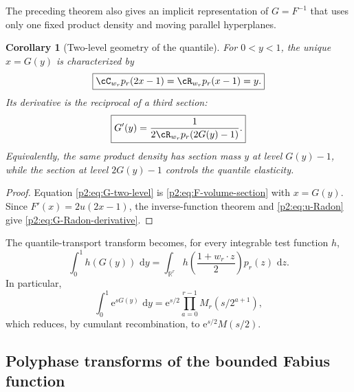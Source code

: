 \documentclass[11pt,oneside]{article}
\newtheorem{corollary}[theorem]{Corollary}
\theoremstyle{definition}
\newcommand{\dd}{\,\mathrm d}
\newcommand{\e}{\mathrm e}
\newcommand{\R}{\mathbb R}
\begin{document}
The preceding theorem also gives an implicit representation of $G=F^{-1}$ that
uses only one fixed product density and moving parallel hyperplanes.

\begin{corollary}[Two-level geometry of the quantile]
\label{p2:cor:inverse-geometry}
For $0<y<1$, the unique $x=G(y)$ is characterized by
\begin{equation}
 \boxed{\displaystyle
 \cC_{w_r}p_r(2x-1)=\cR_{w_r}p_r(x-1)=y.}                 \label{p2:eq:G-two-level}
\end{equation}
Its derivative is the reciprocal of a third section:
\begin{equation}
 \boxed{\displaystyle
 G'(y)=\frac1{2\cR_{w_r}p_r(2G(y)-1)}.}                   \label{p2:eq:G-Radon-derivative}
\end{equation}
Equivalently, the same product density has section mass $y$ at level $G(y)-1$,
while the section at level $2G(y)-1$ controls the quantile elasticity.
\end{corollary}

\begin{proof}
Equation \eqref{p2:eq:G-two-level} is \eqref{p2:eq:F-volume-section} with $x=G(y)$.
Since $F'(x)=2u(2x-1)$, the inverse-function theorem and
\eqref{p2:eq:u-Radon} give \eqref{p2:eq:G-Radon-derivative}.
\end{proof}

The quantile-transport transform becomes, for every integrable test function
$h$,
\begin{equation}
 \int_0^1h(G(y))\,\dd y
 =\int_{\R^r}h\!\left(\frac{1+w_r\cdot z}{2}\right)
   p_r(z)\,\dd z.                                         \label{p2:eq:G-product-cube}
\end{equation}
In particular,
\begin{equation}
 \int_0^1\e^{sG(y)}\,\dd y
 =\e^{s/2}\prod_{a=0}^{r-1}M_r(s/2^{a+1}),                \label{p2:eq:G-polyphase-MGF}
\end{equation}
which reduces, by cumulant recombination, to
$\e^{s/2}M(s/2)$.

\subsection{Polyphase transforms of the bounded Fabius function}
\end{document}
